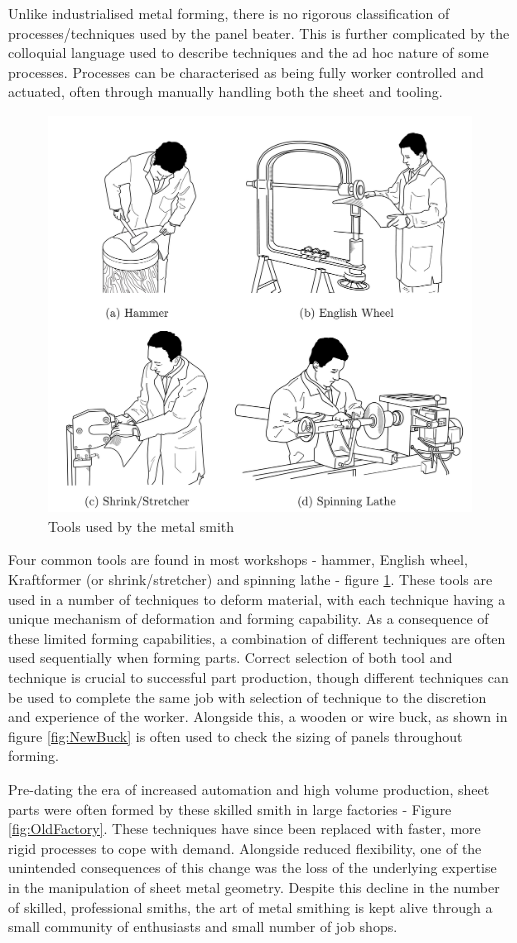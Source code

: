 Unlike industrialised metal forming, there is no rigorous classification of processes/techniques used by the panel beater. This is further complicated by the colloquial language used to describe techniques and the ad hoc nature of some processes. Processes can be characterised as being fully worker controlled and actuated, often through manually handling both the sheet and tooling.

\begin{figure}[h]
    \centering
    \includegraphics[width=0.8\linewidth]{Diagrams/Drawings.pdf}
    \caption{Tools used by the metal smith}
    \label{fig:Drawings}
\end{figure}

Four common tools are found in most workshops - hammer, English wheel, Kraftformer (or shrink/stretcher) and spinning lathe - figure \ref{fig:Drawings}. These tools are used in a number of techniques to deform material, with each technique having a unique mechanism of deformation and forming capability. As a consequence of these limited forming capabilities, a combination of different techniques are often used sequentially when forming parts. Correct selection of both tool and technique is crucial to successful part production, though different techniques can be used to complete the same job with selection of technique to the discretion and experience of the worker. Alongside this, a wooden or wire buck, as shown in figure \ref{fig:NewBuck} is often used to check the sizing of panels throughout forming.

Pre-dating the era of increased automation and high volume production, sheet parts were often formed by these skilled smith in large factories - Figure \ref{fig:OldFactory}. These techniques have since been replaced with faster, more rigid processes to cope with demand. Alongside reduced flexibility, one of the unintended consequences of this change was the loss of the underlying expertise in the manipulation of sheet metal geometry.  Despite this decline in the number of skilled, professional smiths, the art of metal smithing is kept alive through a small community of enthusiasts and small number of job shops. 

